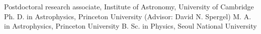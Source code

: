 %
%
%



\begin{scholarship}
					{Postdoctoral research associate, Institute of Astronomy, University of Cambridge}
					{Ph. D. in Astrophysics, Princeton University (Advisor: David N. Spergel)}
					{M. A. in Astrophysics, Princeton University}
					{B. Sc. in Physics, Seoul National University}
\end{scholarship}
